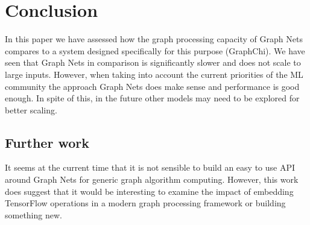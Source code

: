 \documentclass[sigconf,nonacm]{acmart}
\begin{document}
\section{Conclusion}

In this paper we have assessed how the graph processing capacity of Graph Nets compares to a system designed specifically for this purpose (GraphChi). We have seen that Graph Nets in comparison is significantly slower and does not scale to large inputs. However, when taking into account the current priorities of the ML community the approach Graph Nets does make sense and performance is good enough. In spite of this, in the future other models may need to be explored for better scaling.

\subsection{Further work}

It seems at the current time that it is not sensible to build an easy to use API around Graph Nets for generic graph algorithm computing. However, this work does suggest that it would be interesting to examine the impact of embedding TensorFlow operations in a modern graph processing framework or building something new.



\end{document}
